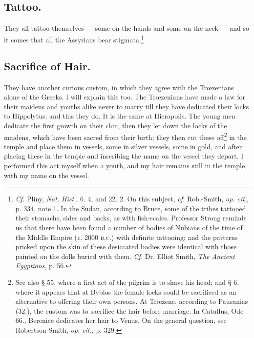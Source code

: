 \documentclass[a4paper, 11pt, oneside, polutonikogreek, english]{article}
\begin{document}
\subsection{Tattoo.}
\paragraph{}
They all tattoo themselves --- some on the hands and some on the neck --- and so it comes that all the Assyrians bear stigmata.\footnote{\emph{Cf.} Pliny, \emph{Nat. Hist.}, 6. 4, and 22. 2. On this subject, \emph{cf.} Rob.-Smith, \emph{op. cit.}, p. 334, note 1. In the Sudan, according to Bruce, some of the tribes tattooed their stomachs, sides and backs, as with fish-scales. Professor Strong reminds us that there have been found a number of bodies of Nubians of the time of the Middle Empire (\emph{c.} 2000 \textsc{b.c.}) with definite tattooing; and the patterns pricked upon the skin of these desiccated bodies were identical with those painted on the dolls buried with them. \emph{Cf.} Dr. Elliot Smith, \emph{The Ancient Egyptians}, p. 56.}

\subsection{Sacrifice of Hair.}
\paragraph{}
They have another curious custom, in which they agree with the Trœzenians alone of the Greeks. I will explain this too. The Trœzenians have made a law for their maidens and youths alike never to marry till they have dedicated their locks to Hippolytus; and this they do. It is the same at Hierapolis. The young men dedicate the first growth on their chin, then they let down the locks of the maidens, which have been sacred from their birth; they then cut these off\footnote{See also § 55, where a first act of the pilgrim is to shave his head; and § 6, where it appears that at Byblos the female locks could be sacrificed as an alternative to offering their own persons. At Trœzene, according to Pausanias (32.), the custom was to sacrifice the hair before marriage. In Catullus, Ode 66., Berenice dedicates her hair to Venus. On the general question, see Robertson-Smith, \emph{op. cit.}, p. 329.} in the temple and place them in vessels, some in silver vessels, some in gold, and after placing these in the temple and inscribing the name on the vessel they depart. I performed this act myself when a youth, and my hair remains still in the temple, with my name on the vessel.
\end{document}
